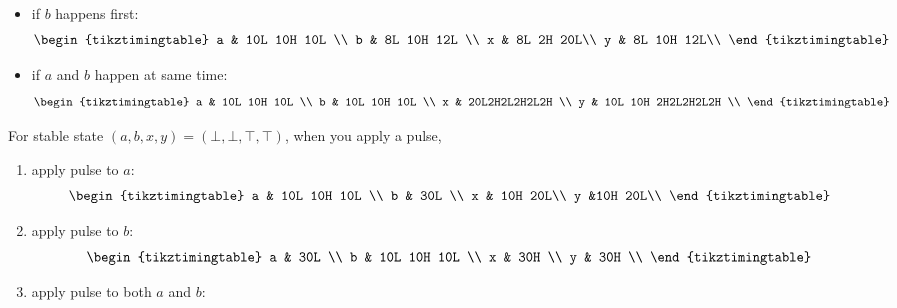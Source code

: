 \documentclass[11pt,twoside]{article}
\begin{document}
\begin{enumerate}[leftmargin=0pt]
\begin{enumerate}
\begin{enumerate}
\begin{itemize}[label = {}]
\[\begin{tikztimingtable}
                			 b	& 12L 10H 8L \\
                			 x 	& 20L 10H\\
                			 y 	& 12L 18H \\
                			\end{tikztimingtable} \] 
			 \item if $b$ happens first:
			        \[\begin{tikztimingtable} 
                			 a	& 10L 10H 10L \\
                			 b	& 8L 10H 12L \\
                			 x 	& 8L 2H 20L\\
                			 y 	& 8L 10H 12L\\
                			\end{tikztimingtable} \] 
			\item if $a$ and $b$ happen at same time:
			        \[\begin{tikztimingtable} 
                			 a	& 10L 10H 10L \\
                			 b	& 10L 10H 10L \\
                			 x 	& 20L2H2L2H2L2H \\
                			 y 	& 10L 10H 2H2L2H2L2H \\
                			\end{tikztimingtable} \] 				
			\end{itemize}
		\end{enumerate}
		For stable state $(a,b,x,y) = (\bot, \bot, \top, \top)$, when you apply a pulse,
		\begin{enumerate}
		\item apply pulse to $a$:
			\[\begin{tikztimingtable} 
			 a	& 10L 10H 10L \\
			 b	& 30L \\
			 x 	& 10H 20L\\
			 y 	&10H 20L\\
			\end{tikztimingtable} \]
		\item apply pulse to $b$:
			\[\begin{tikztimingtable} 
			 a	& 30L \\
			 b	& 10L 10H 10L \\
			 x 	& 30H \\
			 y 	& 30H \\
			\end{tikztimingtable} \]
		\item apply pulse to both $a$ and $b$:

\end{enumerate}
\end{enumerate}
\end{enumerate}
\end{document}
